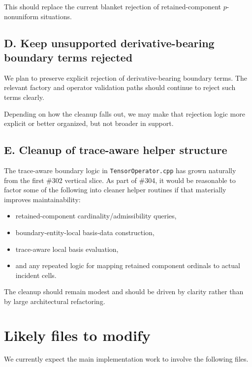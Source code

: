 \documentclass[11pt]{article}
\begin{document}
This should replace the current blanket rejection of retained-component \(p\)-nonuniform situations.

\subsection{D. Keep unsupported derivative-bearing boundary terms rejected}

We plan to preserve explicit rejection of derivative-bearing boundary terms. The relevant factory and operator validation paths should continue to reject such terms clearly.

Depending on how the cleanup falls out, we may make that rejection logic more explicit or better organized, but not broader in support.

\subsection{E. Cleanup of trace-aware helper structure}

The trace-aware boundary logic in \texttt{TensorOperator.cpp} has grown naturally from the first \#302 vertical slice. As part of \#304, it would be reasonable to factor some of the following into cleaner helper routines if that materially improves maintainability:
\begin{itemize}[leftmargin=*]
  \item retained-component cardinality/admissibility queries,
  \item boundary-entity-local basis-data construction,
  \item trace-aware local basis evaluation,
  \item and any repeated logic for mapping retained component ordinals to actual incident cells.
\end{itemize}

The cleanup should remain modest and should be driven by clarity rather than by large architectural refactoring.

\section{Likely files to modify}

We currently expect the main implementation work to involve the following files.
\end{document}
